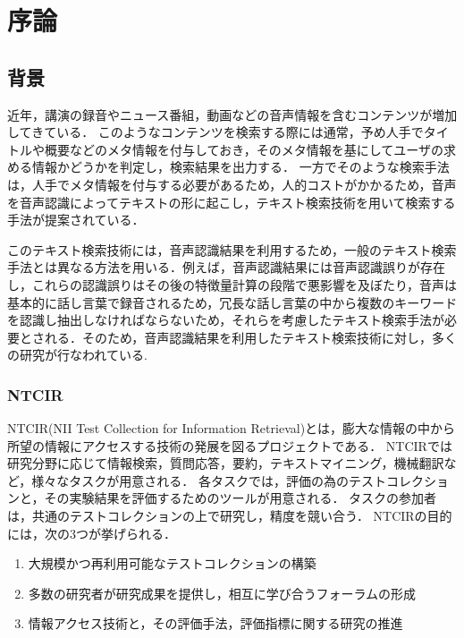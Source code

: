 ﻿%

\chapter{序論} %
\section{背景}
近年，講演の録音やニュース番組，動画などの音声情報を含むコンテンツが増加してきている．
このようなコンテンツを検索する際には通常，予め人手でタイトルや概要などのメタ情報を付与しておき，そのメタ情報を基にしてユーザの求める情報かどうかを判定し，検索結果を出力する．
一方でそのような検索手法は，人手でメタ情報を付与する必要があるため，人的コストがかかるため，音声を音声認識によってテキストの形に起こし，テキスト検索技術を用いて検索する手法が提案されている．

このテキスト検索技術には，音声認識結果を利用するため，一般のテキスト検索手法とは異なる方法を用いる．例えば，音声認識結果には音声認識誤りが存在し，これらの認識誤りはその後の特徴量計算の段階で悪影響を及ぼたり，音声は基本的に話し言葉で録音されるため，冗長な話し言葉の中から複数のキーワードを認識し抽出しなければならないため，それらを考慮したテキスト検索手法が必要とされる．そのため，音声認識結果を利用したテキスト検索技術に対し，多くの研究が行なわれている. 

\subsection{NTCIR}
NTCIR(NII Test Collection for Information Retrieval)\cite{NTCIR}とは，膨大な情報の中から所望の情報にアクセスする技術の発展を図るプロジェクトである．
NTCIRでは研究分野に応じて情報検索，質問応答，要約，テキストマイニング，機械翻訳など，様々なタスクが用意される．
各タスクでは，評価の為のテストコレクションと，その実験結果を評価するためのツールが用意される．
タスクの参加者は，共通のテストコレクションの上で研究し，精度を競い合う．
NTCIRの目的には，次の3つが挙げられる．
\begin{enumerate}
    \item 大規模かつ再利用可能なテストコレクションの構築
    \item 多数の研究者が研究成果を提供し，相互に学び合うフォーラムの形成
    \item 情報アクセス技術と，その評価手法，評価指標に関する研究の推進
\end{enumerate}

